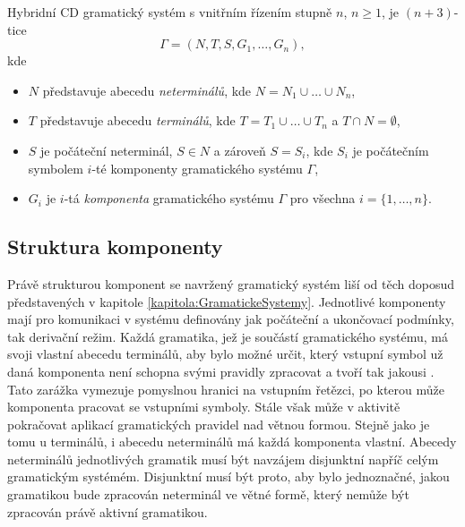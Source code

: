 \begin{definice}
  Hybridní CD gramatický systém s vnitřním řízením stupně $n$, $n \geq 1$, je $(n+3)$-tice
  $$\Gamma = (N, T, S, G_1, \dots, G_n),$$
  kde
  \begin{itemize}
    \item $N$ představuje abecedu \emph{neterminálů}, kde $N = N_1 \cup \dots \cup N_n$,
    \item $T$ představuje abecedu \emph{terminálů}, kde $T = T_1 \cup \dots \cup T_n$ a $T \cap N = \emptyset$,
    \item $S$ je počáteční neterminál, $S \in N$ a zároveň $S = S_i$, kde $S_i$ je počátečním symbolem $i$-té komponenty gramatického systému $\Gamma$,
    \item $G_i$ je $i$-tá \emph{komponenta} gramatického systému $\Gamma$ pro všechna $i = \{1, \dots, n\}$.
  \end{itemize}
\end{definice}

\subsection*{Struktura komponenty}
Právě strukturou komponent se navržený gramatický systém liší od těch doposud představených v kapitole \ref{kapitola:GramatickeSystemy}.
Jednotlivé komponenty mají pro komunikaci v systému definovány jak počáteční a ukončovací podmínky, tak derivační režim.
Každá gramatika, jež je součástí gramatického systému, má svoji vlastní abecedu terminálů, aby bylo možné určit, který vstupní symbol už daná komponenta
není schopna svými pravidly zpracovat a tvoří tak jakousi . Tato zarážka vymezuje pomyslnou hranici na vstupním řetězci, po kterou
může komponenta pracovat se vstupními symboly. Stále však může v aktivitě pokračovat aplikací gramatických pravidel nad větnou formou. Stejně jako je tomu u terminálů, i
abecedu neterminálů má každá komponenta vlastní. Abecedy neterminálů jednotlivých gramatik musí být navzájem disjunktní napříč celým gramatickým systémém.
Disjunktní musí být proto, aby bylo jednoznačné, jakou gramatikou bude zpracován neterminál ve větné formě, který nemůže být zpracován právě aktivní gramatikou.

